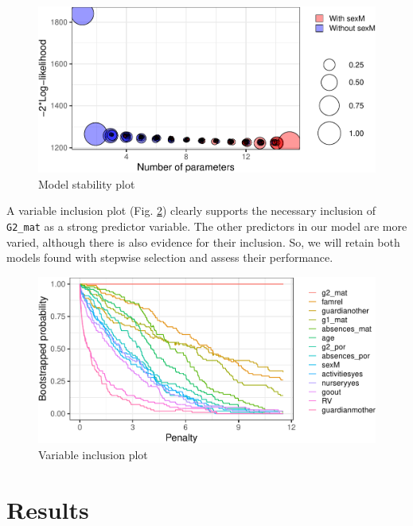 \documentclass[a4paper,9pt,twocolumn,twoside,]{pinp}
\begin{document}
\begin{figure}[htbp]

{\centering \includegraphics[width=0.85\linewidth]{Executive-summary_files/figure-latex/model-stability-1} 

}

\caption{Model stability plot}\label{fig:model-stability}
\end{figure}

A variable inclusion plot (Fig. \ref{fig:vip-plot}) clearly supports the
necessary inclusion of \texttt{G2\_mat} as a strong predictor variable.
The other predictors in our model are more varied, although there is
also evidence for their inclusion. So, we will retain both models found
with stepwise selection and assess their performance.

\begin{figure}[htbp]

{\centering \includegraphics[width=0.85\linewidth]{Executive-summary_files/figure-latex/vip-plot-1} 

}

\caption{Variable inclusion plot}\label{fig:vip-plot}
\end{figure}

\hypertarget{results}{%
\section{Results}\label{results}}
\end{document}
